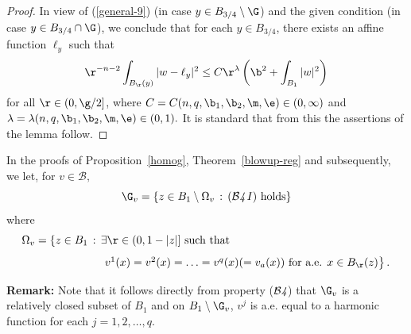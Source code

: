 \documentclass[a4paper,11pt]{amsart}
\begin{document}
\begin{proof}
 In view of (\ref{general-9}) (in case $y \in B_{3/4} \setminus \G$) and the given condition (in case $y \in B_{3/4} \cap \G$), we conclude that for each $y \in B_{3/4}$, there exists an affine function $\ell_{y}$ such that 
\begin{equation}\label{general-10}
\r^{-n-2}\int_{B_{\r}(y)} |w - \ell_{y}|^{2} \leq C\r^{\lambda} \left(\b^{2} + \int_{B_{1}}|w|^{2}\right)
\end{equation}
for all $\r \in (0, \g/2]$, where $C = C(n, q, \b_{1}, \b_{2}, \m, \e) \in (0, \infty)$ and 
$\lambda = \lambda(n, q, \b_{1}, \b_{2}, \m, \e) \in (0, 1).$ It is standard that from this the assertions of the lemma follow. 
\end{proof}


In the proofs of Proposition~\ref{homog}, Theorem~\ref{blowup-reg} and subsequently, we let, for $v \in {\mathcal B},$ 
$$\G_{v} = \left\{z \in B_{1} \setminus \Omega_{v} \, : \, \mbox{(${\mathcal B{\emph 4 \, I}}$) holds}\right\}$$
where
$$\Omega_{v} = \left\{z \in B_{1} \, : \, \mbox{$\exists \r \in (0, 1-|z|]$ such that}\right.\hspace{2in}$$
$$\hspace{1in}\left.\mbox{$v^{1}(x) =v^{2}(x) = \ldots =v^{q}(x) (= v_{a}(x))$ for a.e. $x \in B_{\r}(z)$}\right\}.$$ 

\noindent
{\bf Remark:} Note that it follows directly from  property (${\mathcal B{\emph 4}}$) that $\G_{v}$ is a relatively closed subset of $B_{1}$ and on $B_{1} \setminus \G_{v}$, $v^{j}$ is a.e. equal to a harmonic function  for each $j=1, 2, \ldots, q.$
\end{document}
